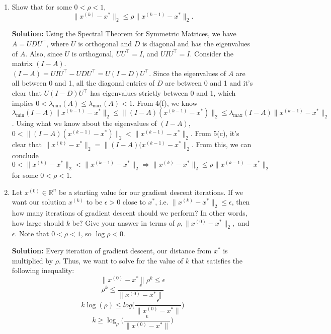 \documentclass{article}
\newcommand{\solution}{\textbf{Solution: }}
\newcommand{\R}{\mathbb{R}}
\begin{document}
\begin{enumerate}[label=(\alph*)]
    \newpage
    \item Show that for some $0 < \rho < 1$, $$\lVert x^{(k)} - x^* \rVert_2 \leq \rho \lVert x^{(k-1)} - x^* \rVert_2.$$
    \begin{mdframed}
    \solution Using the Spectral Theorem for Symmetric Matrices, we have $A=UDU^{\top}$, where $U$ is orthogonal and $D$ is diagonal and has the eigenvalues of $A$. Also, since $U$ is orthogonal, $UU^{\top}=I$, and $UIU^{\top}=I$. Consider the matrix $(I-A)$.\\
    $(I-A)=UIU^{\top}-UDU^{\top}=U(I-D)U^{\top}$. Since the eigenvalues of $A$ are all between 0 and 1, all the diagonal entries of $D$ are between 0 and 1 and it's clear that $U(I-D)U^{\top}$ has eigenvalues strictly between 0 and 1, which implies $0<\lambda_{\min}(A) \leq \lambda_{\max}(A) < 1$. From 4(f), we know\\
    $\lambda_{\min}(I-A)\lVert x^{(k-1)}-x^*\rVert_2 \leq \lVert (I-A)(x^{(k-1)}-x^*) \rVert_2 \leq \lambda_{\max}(I-A)\lVert x^{(k-1)}-x^*\rVert_2$. Using what we know about the eigenvalues of $(I-A)$,
    $0 < \lVert (I-A)(x^{(k-1)}-x^*) \rVert_2 < \lVert x^{(k-1)}-x^*\rVert_2$. From 5(c), it's clear that
    $\lVert x^{(k)}-x^*\rVert_2=\lVert (I-A)(x^{(k-1)}-x^*\rVert_2$. From this, we can conclude $0 < \lVert x^{(k)}-x^* \rVert_2 < \lVert x^{(k-1)}-x^*\rVert_2 \Rightarrow \lVert x^{(k)}-x^* \rVert_2 \leq \rho\lVert x^{(k-1)}-x^*\rVert_2$ for some $0 < \rho < 1$.
    \end{mdframed}
    
    \item Let $x^{(0)} \in \R^n$ be a starting value for our gradient descent iterations. If we want our solution $x^{(k)}$ to be $\epsilon > 0$ close to $x^*$, i.e. $\lVert x^{(k)} - x^* \rVert_2 \leq \epsilon$, then how many iterations of gradient descent should we perform? In other words, how large should $k$ be? Give your answer in terms of $\rho, \lVert x^{(0)} - x^*\rVert_2, $ and $\epsilon$. Note that $0 < \rho < 1$, so $\log \rho < 0$. 
    \begin{mdframed}
    \solution Every iteration of gradient descent, our distance from $x^*$ is multiplied by $\rho$. Thus, we want to solve for the value of $k$ that satisfies the following inequality:
    $$\lVert x^{(0)}-x^*\rVert\rho^k \leq \epsilon$$
    $$\rho^k\leq \frac{\epsilon}{\lVert x^{(0)}-x^*\rVert}$$
    $$k\log(\rho) \leq log\bigg(\frac{\epsilon}{\lVert x^{(0)}-x^*\rVert}\bigg)$$
    $$k\geq \log_{\rho}\bigg(\frac{\epsilon}{\lVert x^{(0)}-x^*\rVert}\bigg)$$
    \end{mdframed}
    

\end{enumerate}
\end{document}
